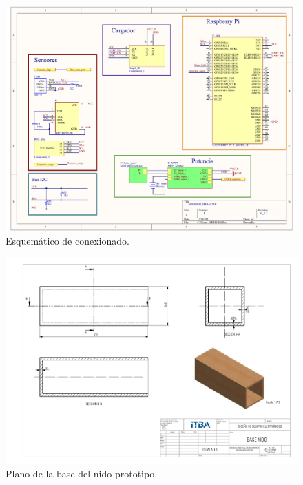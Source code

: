 
\begin{figure}[H]
	\centering
	\includegraphics[width=\linewidth]{ImagenesApendice/esquematico}
	\caption{Esquem\'atico de conexionado.}
	\label{fig:esquematico_conexionado}
\end{figure}

\begin{figure}[H]
	\centering
	\includegraphics[width=\linewidth]{ImagenesApendice/Base_nido_plano}
	\caption{Plano de la base del nido prototipo.}
	\label{fig:Base_nido_plano}
\end{figure}

